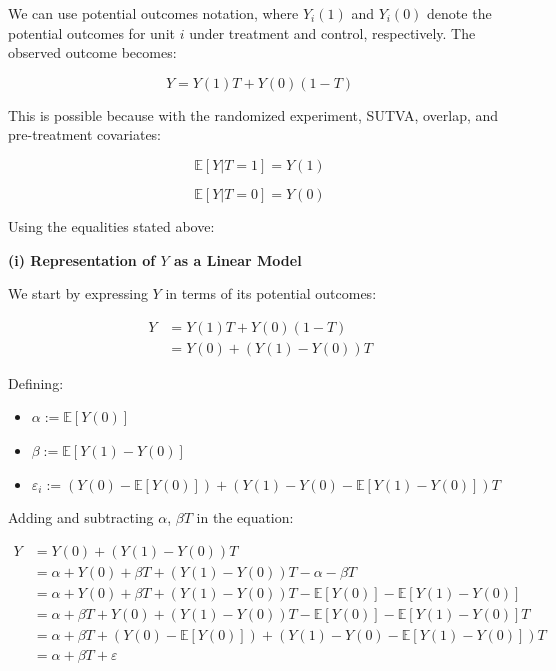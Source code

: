 \documentclass{article}
\begin{document}
We can use potential outcomes notation, where \(Y_i(1)\) and \(Y_i(0)\) denote the potential outcomes for unit \(i\) under treatment and control, respectively. The observed outcome becomes:

\[
Y = Y(1) T + Y(0) (1 - T)
\]

This is possible because with the randomized experiment, SUTVA, overlap, and pre-treatment covariates:

$$
\mathbb{E}[Y | T = 1] = Y(1)
$$

$$
\mathbb{E}[Y | T = 0] = Y(0)
$$

Using the equalities stated above:


\textbf{(i) Representation of \(Y\) as a Linear Model}

We start by expressing \(Y\) in terms of its potential outcomes:

\begin{align*}
  Y &= Y(1) T + Y(0) (1 - T) \\
    &= Y(0) + \left( Y(1) - Y(0) \right) T
\end{align*}

Defining:

\begin{itemize}
  \item \(\alpha := \mathbb{E}[Y(0)]\)
  \item \(\beta := \mathbb{E}[Y(1) - Y(0)]\)
  \item \(\varepsilon_i := \left( Y(0) - \mathbb{E}[Y(0)] \right) + \left( Y(1) - Y(0) - \mathbb{E}[Y(1) - Y(0)] \right) T\)
\end{itemize}

Adding and subtracting $\alpha$, $\beta T$ in the equation:

\begin{align*}
  Y &= Y(0) + \left( Y(1) - Y(0) \right) T \\
    &= \alpha + Y(0) + \beta T + \left( Y(1) - Y(0) \right) T - \alpha - \beta T \\
    &= \alpha + Y(0) + \beta T + \left( Y(1) - Y(0) \right) T - \mathbb{E}[Y(0)] - \mathbb{E}[Y(1) - Y(0)] \\
    &= \alpha + \beta T + Y(0) + \left( Y(1) - Y(0) \right) T - \mathbb{E}[Y(0)] - \mathbb{E}[Y(1) - Y(0)] T \\
    &= \alpha + \beta T + \left( Y(0) - \mathbb{E}[Y(0)] \right) + \left( Y(1) - Y(0) - \mathbb{E}[Y(1) - Y(0)] \right) T \\
    &= \alpha + \beta T + \varepsilon
\end{align*}
\end{document}
